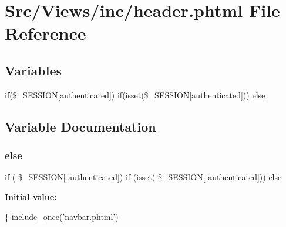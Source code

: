 \hypertarget{header_8phtml}{}\section{Src/\+Views/inc/header.phtml File Reference}
\label{header_8phtml}
\subsection*{Variables}
\begin{DoxyCompactItemize}
\item 
if(\$\+\_\+\+S\+E\+S\+S\+I\+ON\mbox{[}\textquotesingle{}authenticated\textquotesingle{}\mbox{]}) if(isset(\$\+\_\+\+S\+E\+S\+S\+I\+ON\mbox{[}\textquotesingle{}authenticated\textquotesingle{}\mbox{]})) \hyperlink{header_8phtml_a1dcfa257dd0f03188ac481d49546ca80}{else}
\end{DoxyCompactItemize}


\subsection{Variable Documentation}
\mbox{\label{header_8phtml_a1dcfa257dd0f03188ac481d49546ca80}} 
\subsubsection{\texorpdfstring{else}{else}}
{\footnotesize\ttfamily if ( \$\+\_\+\+S\+E\+S\+S\+I\+ON\mbox{[} \textquotesingle{}authenticated\textquotesingle{}\mbox{]}) if (isset( \$\+\_\+\+S\+E\+S\+S\+I\+ON\mbox{[} \textquotesingle{}authenticated\textquotesingle{}\mbox{]})) else}

{\bfseries Initial value\+:}
\begin{DoxyCode}
\{
      include\_once(\textcolor{stringliteral}{'navbar.phtml'})
\end{DoxyCode}
